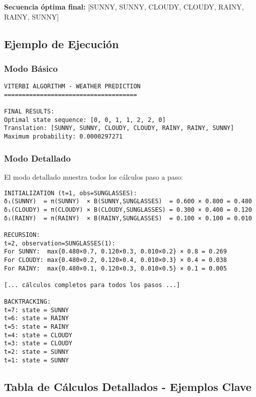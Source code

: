 \documentclass[
]{article}
\begin{document}
\textbf{Secuencia óptima final:} {[}SUNNY, SUNNY, CLOUDY, CLOUDY, RAINY,
RAINY, SUNNY{]}

\subsection{Ejemplo de Ejecución}\label{ejemplo-de-ejecuciuxf3n}

\subsubsection{Modo Básico}\label{modo-buxe1sico}

\begin{verbatim}
VITERBI ALGORITHM - WEATHER PREDICTION
=====================================

FINAL RESULTS:
Optimal state sequence: [0, 0, 1, 1, 2, 2, 0]
Translation: [SUNNY, SUNNY, CLOUDY, CLOUDY, RAINY, RAINY, SUNNY]
Maximum probability: 0.0000297271
\end{verbatim}

\subsubsection{Modo Detallado}\label{modo-detallado}

El modo detallado muestra todos los cálculos paso a paso:

\begin{verbatim}
INITIALIZATION (t=1, obs=SUNGLASSES):
δ₁(SUNNY)  = π(SUNNY)  × B(SUNNY,SUNGLASSES)  = 0.600 × 0.800 = 0.480
δ₁(CLOUDY) = π(CLOUDY) × B(CLOUDY,SUNGLASSES) = 0.300 × 0.400 = 0.120
δ₁(RAINY)  = π(RAINY)  × B(RAINY,SUNGLASSES)  = 0.100 × 0.100 = 0.010

RECURSION:
t=2, observation=SUNGLASSES(1):
For SUNNY:  max{0.480×0.7, 0.120×0.3, 0.010×0.2} × 0.8 = 0.269
For CLOUDY: max{0.480×0.2, 0.120×0.4, 0.010×0.3} × 0.4 = 0.038
For RAINY:  max{0.480×0.1, 0.120×0.3, 0.010×0.5} × 0.1 = 0.005

[... cálculos completos para todos los pasos ...]

BACKTRACKING:
t=7: state = SUNNY
t=6: state = RAINY
t=5: state = RAINY
t=4: state = CLOUDY
t=3: state = CLOUDY
t=2: state = SUNNY
t=1: state = SUNNY
\end{verbatim}

\subsection{Tabla de Cálculos Detallados - Ejemplos
Clave}\label{tabla-de-cuxe1lculos-detallados---ejemplos-clave}
\end{document}
